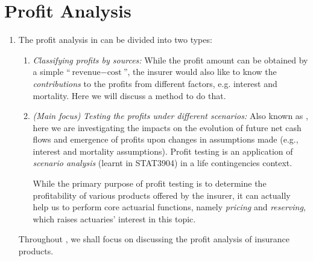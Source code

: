 \section{Profit Analysis}
\label{sect:profit-analysis}
\begin{enumerate}
\item The profit analysis in  can be divided into
two types:
\begin{enumerate}[label={(\arabic*)}]
\item \emph{Classifying profits by sources:} While the profit amount can be
obtained by a simple ``\(\text{revenue}-\text{cost}\)'', the insurer would also
like to know the \emph{contributions} to the profits from different factors,
e.g. interest and mortality. Here we will discuss a method to do that.

\item \emph{(Main focus)} \emph{Testing the profits under different scenarios:}
Also known as , here we are investigating the impacts on
the evolution of future net cash flows and emergence of profits upon changes in
assumptions made (e.g., interest and mortality assumptions). Profit testing is
an application of \emph{scenario analysis} (learnt in STAT3904) in a life
contingencies context.

While the primary purpose of profit testing is to determine the profitability
of various products offered by the insurer, it can actually help us to perform
core actuarial functions, namely \emph{pricing} and \emph{reserving}, which
raises actuaries' interest in this topic.
\end{enumerate}
\begin{note}
Throughout , we shall focus on discussing the
profit analysis of insurance products.
\end{note}
\end{enumerate}
